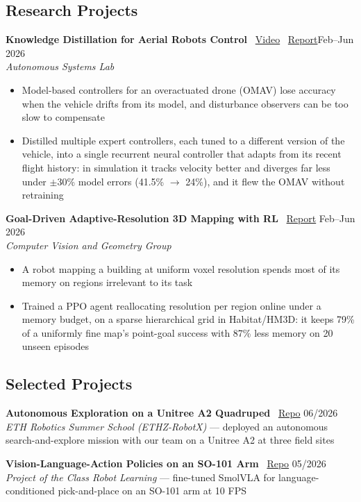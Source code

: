 \documentclass[a4paper,10pt]{article}
\begin{document}
\subsection*{Research Projects}
\textbf{Knowledge Distillation for Aerial Robots Control} \faVideo\ \href{https://www.youtube.com/watch?v=oPd9mkxEaO8}{Video} \faFilePdf\ \href{https://alessiosalvatore1703-ops.github.io/assets/projects/aerial-knowledge-distillation/ReportPLR_Salvatore_Stefanini.pdf}{Report}\hfill Feb--Jun 2026\\
\textit{Autonomous Systems Lab}
\begin{itemize}
    \vspace{-5pt}
    \item Model-based controllers for an overactuated drone (OMAV) lose accuracy when the vehicle drifts from its model, and disturbance observers can be too slow to compensate
    \item Distilled multiple expert controllers, each tuned to a different version of the vehicle, into a single recurrent neural controller that adapts from its recent flight history: in simulation it tracks velocity better and diverges far less under $\pm$30\% model errors (41.5\% $\rightarrow$ 24\%), and it flew the OMAV without retraining
\end{itemize}
\textbf{Goal-Driven Adaptive-Resolution 3D Mapping with RL} \faFilePdf\ \href{https://alessiosalvatore1703-ops.github.io/assets/projects/task-aware-3d-mapping/3dv_final_report.pdf}{Report}
\hfill Feb--Jun 2026\\
\textit{Computer Vision and Geometry Group}
\begin{itemize}
    \vspace{-5pt}
    \item A robot mapping a building at uniform voxel resolution spends most of its memory on regions irrelevant to its task
    \item Trained a PPO agent reallocating resolution per region online under a memory budget, on a sparse hierarchical grid in Habitat/HM3D: it keeps 79\% of a uniformly fine map's point-goal success with 87\% less memory on 20 unseen episodes
\end{itemize}

\subsection*{Selected Projects}
\textbf{Autonomous Exploration on a Unitree A2 Quadruped} \faGithub\ \href{https://github.com/alessiosalvatore1703-ops/RSS_sim2win}{Repo} \hfill 06/2026\\
\textit{ETH Robotics Summer School (ETHZ-RobotX)} --- deployed an autonomous search-and-explore mission with our team on a Unitree A2 at three field sites

\textbf{Vision-Language-Action Policies on an SO-101 Arm} \faGithub\ \href{https://github.com/alessiosalvatore1703-ops/VLA-robotlearning}{Repo} \hfill 05/2026\\
\textit{Project of the Class Robot Learning} --- fine-tuned SmolVLA for language-conditioned pick-and-place on an SO-101 arm at 10 FPS
\end{document}
